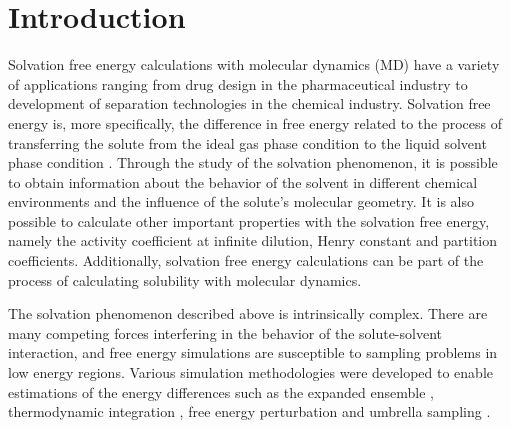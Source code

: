 \chapter{Introduction} %
\label{Chapter1} %
\pagestyle{simple}
\doublespacing
Solvation free energy calculations with molecular dynamics (MD) have a variety of applications ranging from drug design in the pharmaceutical industry to development of separation technologies in the chemical industry. {Solvation free energy is, more specifically, the difference in free energy related to the process of transferring the solute from the ideal gas phase condition to the liquid solvent phase condition \cite{shirts2013}} . Through the study of the solvation phenomenon, it is possible to obtain information about the behavior of the solvent in different chemical environments and the influence of the solute's molecular geometry. It is also possible to calculate other important properties with the solvation free energy, namely the activity coefficient at infinite dilution, Henry constant and partition coefficients.{ Additionally, solvation free energy calculations can be part of the process of calculating solubility with molecular dynamics}. 

The solvation phenomenon described above is intrinsically complex. There are many competing forces interfering in the behavior of the solute-solvent interaction, and free energy simulations are susceptible to sampling problems in low energy regions. {Various simulation methodologies were developed to enable estimations of the energy differences} such as the expanded ensemble \cite{lyubartsev}, thermodynamic integration \cite{kirkwood1935}, free energy perturbation \cite{zwanzig1954,bennet1976,mbar} and umbrella sampling \cite{TORRIE1977187}. 


